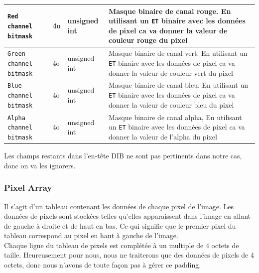 \documentclass[a4paper]{article}
\begin{document}
\begin{center}
\begin{tabular}{ | p{4cm} | p{0.8cm} | p{1.2cm} | p{10cm} | }
				\hline
				\texttt{Red channel bitmask} 	& 4o     & unsigned int  & Masque binaire de canal rouge. En utilisant un \texttt{ET} binaire avec les données de pixel ca va donner la valeur de couleur rouge du pixel \\
				\hline
				\texttt{Green channel bitmask}   & 4o 	 & unsigned int  & Masque binaire de canal vert. En utilisant un \texttt{ET} binaire avec les données de pixel ca va donner la valeur de couleur vert du pixel \\
				\hline
				\texttt{Blue channel bitmask}   & 4o 	 & unsigned int  & Masque binaire de canal bleu. En utilisant un \texttt{ET} binaire avec les données de pixel ca va donner la valeur de couleur bleu du pixel \\
				\hline
				\texttt{Alpha channel bitmask}  & 4o     & unsigned int  & Masque binaire de canal alpha, En utilisant un \texttt{ET} binaire avec les données de pixel ca va donner la valeur de l'alpha du pixel \\
				\hline
			\end{tabular}
		\end{center}	
		Les champs restants dans l'en-tête DIB ne sont pas pertinents dans notre cas, donc on va les ignorers.
	
	\subsubsection*{Pixel Array}
	Il s'agit d'un tableau contenant les données de chaque pixel de l'image. Les données de pixels sont stockées telles qu'elles apparaissent dans l'image en allant de gauche à droite et de haut en bas. Ce qui signifie que le premier pixel du tableau correspond au pixel en haut à gauche de l'image.\\
	Chaque ligne du tableau de pixels est complétée à un multiple de 4 octets de taille. Heureusement pour nous, nous ne traiterons que des données de pixels de 4 octets, donc nous n'avons de toute façon pas à gérer ce padding.\\
	
\end{document}
